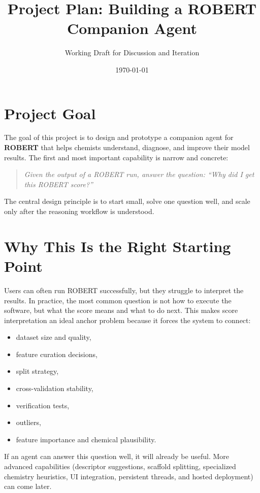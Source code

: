 \documentclass[11pt]{article}
\title{Project Plan: Building a ROBERT Companion Agent}
\author{Working Draft for Discussion and Iteration}
\date{\today}
\begin{document}
\maketitle

\section{Project Goal}
The goal of this project is to design and prototype a companion agent for \textbf{ROBERT} that helps chemists understand, diagnose, and improve their model results. The first and most important capability is narrow and concrete:

\begin{quote}
\textit{Given the output of a ROBERT run, answer the question: ``Why did I get this ROBERT score?''}
\end{quote}

The central design principle is to start small, solve one question well, and scale only after the reasoning workflow is understood.

\section{Why This Is the Right Starting Point}
Users can often run ROBERT successfully, but they struggle to interpret the results. In practice, the most common question is not how to execute the software, but what the score means and what to do next. This makes score interpretation an ideal anchor problem because it forces the system to connect:

\begin{itemize}
    \item dataset size and quality,
    \item feature curation decisions,
    \item split strategy,
    \item cross-validation stability,
    \item verification tests,
    \item outliers,
    \item feature importance and chemical plausibility.
\end{itemize}

If an agent can answer this question well, it will already be useful. More advanced capabilities (descriptor suggestions, scaffold splitting, specialized chemistry heuristics, UI integration, persistent threads, and hosted deployment) can come later.
\end{document}

